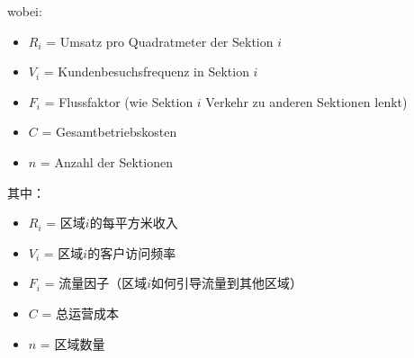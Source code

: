 \begin{otherlanguage}{ngerman}
wobei:
\begin{itemize}
    \item $R_i$ = Umsatz pro Quadratmeter der Sektion $i$
    \item $V_i$ = Kundenbesuchsfrequenz in Sektion $i$
    \item $F_i$ = Flussfaktor (wie Sektion $i$ Verkehr zu anderen Sektionen lenkt)
    \item $C$ = Gesamtbetriebskosten
    \item $n$ = Anzahl der Sektionen
\end{itemize}
\end{otherlanguage}

其中：
\begin{itemize}
    \item $R_i$ = 区域$i$的每平方米收入
    \item $V_i$ = 区域$i$的客户访问频率
    \item $F_i$ = 流量因子（区域$i$如何引导流量到其他区域）
    \item $C$ = 总运营成本
    \item $n$ = 区域数量
\end{itemize}

